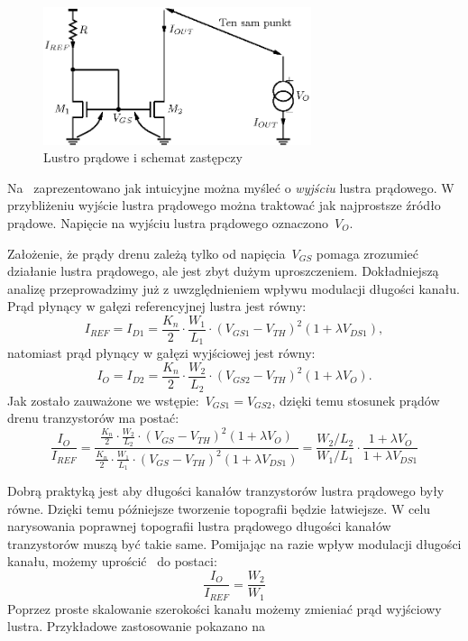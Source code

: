 \documentclass[twoside,pl,final]{labman}
\begin{document}
\begin{figure}[!htbp]
  \centering
  \includegraphics[width=0.7\textwidth]{equiv}
  \caption{Lustro prądowe i schemat zastępczy}
  \label{fig:basic:equiv}
\end{figure}

Na~ zaprezentowano jak intuicyjne można
myśleć o \emph{wyjściu} lustra prądowego.
W przybliżeniu wyjście lustra prądowego można traktować
jak najprostsze źródło prądowe.
Napięcie na wyjściu lustra prądowego oznaczono~$V_O$.

Założenie, że prądy drenu zależą tylko od napięcia~$V_{GS}$
pomaga zrozumieć działanie lustra prądowego,
ale jest zbyt dużym uproszczeniem.
Dokładniejszą analizę przeprowadzimy już z uwzględnieniem wpływu
modulacji długości kanału.
Prąd płynący w gałęzi referencyjnej lustra jest równy:
\begin{equation}
  I_{REF} = I_{D1} = \frac{K_n}{2} \cdot \frac{W_1}{L_1} \cdot
    (V_{GS1} - V_{TH}) ^ 2 (1 + \lambda V_{DS1}),
  \label{eqn:basic:iref}
\end{equation}
natomiast prąd płynący w gałęzi wyjściowej jest równy:
\begin{equation}
  I_O = I_{D2} = \frac{K_n}{2} \cdot \frac{W_2}{L_2} \cdot
    (V_{GS2} - V_{TH}) ^ 2 (1 + \lambda V_O).
  \label{eqn:basic:iout}
\end{equation}
Jak zostało zauważone we wstępie:~$V_{GS1} = V_{GS2}$,
dzięki temu stosunek prądów drenu tranzystorów ma postać:
\begin{equation}
  \frac{I_O}{I_{REF}} =
  \frac{\frac{K_n}{2} \cdot \frac{W_2}{L_2} \cdot (V_{GS} - V_{TH}) ^ 2 (1 + \lambda V_O)}
  {\frac{K_n}{2} \cdot \frac{W_1}{L_1} \cdot (V_{GS} - V_{TH}) ^ 2 (1 + \lambda V_{DS1})} =
  \frac{W_2 / L_2}{W_1 / L_1}
    \cdot \frac{1 + \lambda V_{O}}{1 + \lambda V_{DS1}}
  \label{eqn:basic:iratio}
\end{equation}

Dobrą praktyką jest aby długości kanałów tranzystorów
lustra prądowego były równe.
Dzięki temu późniejsze tworzenie topografii będzie łatwiejsze.
W celu narysowania poprawnej topografii lustra prądowego
długości kanałów tranzystorów muszą być takie same.
Pomijając na razie wpływ modulacji długości kanału,
możemy uprościć~ do postaci:
\begin{equation}
  \frac{I_O}{I_{REF}} = \frac{W_2}{W_1}
  \label{eqn:basic:wratio}
\end{equation}
Poprzez proste skalowanie szerokości kanału
możemy zmieniać prąd wyjściowy lustra.
Przykładowe zastosowanie pokazano na~
\end{document}
